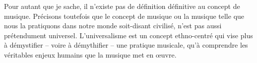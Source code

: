 Pour autant que je sache, il n'existe pas de définition définitive au concept de musique. Précisons toutefois que le concept de musique ou la musique telle que nous la pratiquons dans notre monde soit-disant civilisé, n'est pas aussi prétendument universel. 
L'universalisme est un concept ethno-centré qui vise plus à démystifier -- voire à démythifier -- une pratique musicale, qu'à comprendre les véritables enjeux humains que la musique met en œuvre. 
